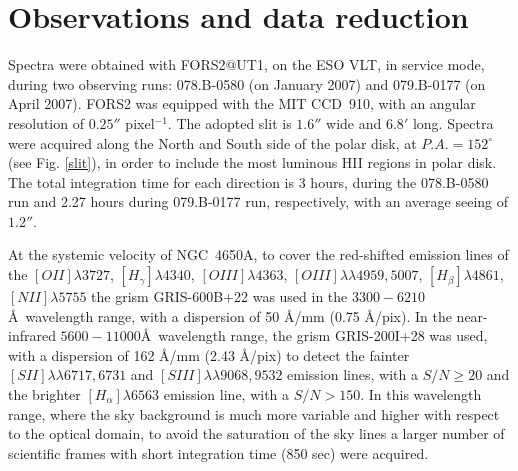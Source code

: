\documentclass[12pt,preprint]{aastex}
\begin{document}
\section{Observations and data reduction}\label{obs}

Spectra were obtained with FORS2@UT1, on the ESO VLT, in service
mode, during two observing runs: 078.B-0580 (on January 2007) and
079.B-0177 (on April 2007). FORS2 was equipped with the MIT
CCD~910, with an angular resolution of $0.25''$ pixel$^{-1}$. The
adopted slit is $1.6 ''$ wide and $6.8'$ long. Spectra were
acquired along the North and South side of the polar disk, at
$P.A.=152^{\circ}$ (see Fig. \ref{slit}), in order to include the
most luminous HII regions in polar disk. The total integration
time for each direction is 3 hours, during the 078.B-0580 run and
2.27 hours during 079.B-0177 run, respectively, with an average
seeing of $1.2 ''$.

At the systemic velocity of NGC~4650A, to cover the red-shifted
emission lines of the $[OII]\lambda3727$, $[H_{\gamma}]\lambda4340$,
$[OIII]\lambda4363$, $[OIII]\lambda\lambda4959,5007$,
$[H_{\beta}]\lambda4861$, $[NII]\lambda5755$ the grism GRIS-600B+22
was used in the $3300-6210$ \AA\ wavelength range, with a dispersion
of 50 \AA/mm (0.75 \AA/pix). In the near-infrared
$5600-11000$\AA\ wavelength range, the grism GRIS-200I+28 was used,
with a dispersion of 162 \AA/mm (2.43 \AA/pix) to detect the fainter
$[SII]\lambda\lambda6717,6731$ and $[SIII]\lambda\lambda9068,9532$
emission lines, with a $S/N \geq 20$ and the brighter
$[H_{\alpha}]\lambda6563$ emission line, with a $S/N >150$. In this
wavelength range, where the sky background is much more variable and
higher with respect to the optical domain, to avoid the saturation of
the sky lines a larger number of scientific frames with short
integration time (850 sec) were acquired.
\end{document}
